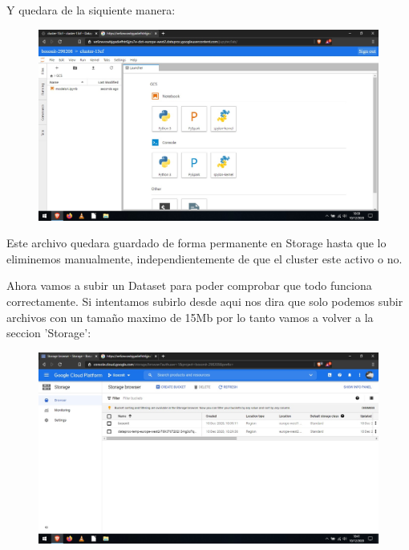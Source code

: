 \documentclass[a4paper,10pt]{article}
\begin{document}
Y quedara de la siquiente manera:

\begin{figure}[H]
\begin{center}
\includegraphics[width=500pt]{./fotos/GoogleCloud/40 - GC.jpg}
\end{center}
\end{figure}

Este archivo quedara guardado de forma permanente en Storage hasta que lo eliminemos manualmente, independientemente de que el cluster este activo o no.

Ahora vamos a subir un Dataset para poder comprobar que todo funciona correctamente. Si intentamos subirlo desde aqui nos dira que solo podemos subir archivos con un tamaño maximo de 15Mb por lo tanto vamos a volver a la seccion 'Storage':

\begin{figure}[H]
\begin{center}
\includegraphics[width=500pt]{./fotos/GoogleCloud/42 - GC.jpg}
\end{center}
\end{figure}
\end{document}
